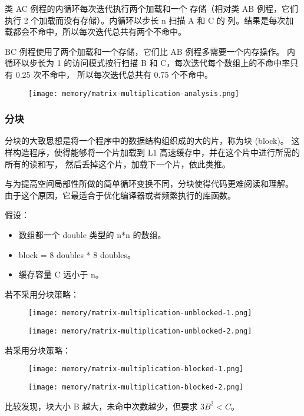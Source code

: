 类 AC 例程的内循环每次迭代执行两个加载和一个
存储（相对类 AB 例程，它们执行 2 个加载而没有存储）。内循环以步长 n 扫描 A 和 C 的
列。结果是每次加载都会不命中，所以每次迭代总共有两个不命中。

BC 例程使用了两个加载和一个存储，它们比 AB 例程多需要一个内存操作。
内循环以步长为 1 的访问模式按行扫描 B 和 C，每次迭代每个数组上的不命中率只有 0.25 次不命中，
所以每次迭代总共有 0.75 个不命中。

\begin{figure}[H]
    \centering
    \texttt{[image: memory/matrix-multiplication-analysis.png]}
\end{figure}

\subsubsection{分块}
分块的大致思想是将一个程序中的数据结构组织成的大的片，称为块 (block)。
这样构造程序，使得能够将一个片加载到 L1 高速缓存中，并在这个片中进行所需的所有的读和写，
然后丢掉这个片，加载下一个片，依此类推。

与为提高空间局部性所做的简单循环变换不同，分块使得代码更难阅读和理解。
由于这个原因，它最适合于优化编译器或者频繁执行的库函数。

假设：
\begin{itemize}
    \item 数组都一个 double 类型的 n*n 的数组。
    \item block = 8 doubles * 8 doubles。
    \item 缓存容量 C 远小于 n。
\end{itemize}

若不采用分块策略：
\begin{figure}[H]
    \centering
    \texttt{[image: memory/matrix-multiplication-unblocked-1.png]}
\end{figure}
\begin{figure}[H]
    \centering
    \texttt{[image: memory/matrix-multiplication-unblocked-2.png]}
\end{figure}
若采用分块策略：
\begin{figure}[H]
    \centering
    \texttt{[image: memory/matrix-multiplication-blocked-1.png]}
\end{figure}
\begin{figure}[H]
    \centering
    \texttt{[image: memory/matrix-multiplication-blocked-2.png]}
\end{figure}

比较发现，块大小 B 越大，未命中次数越少，但要求 $3B^2 < C$。

\newpage